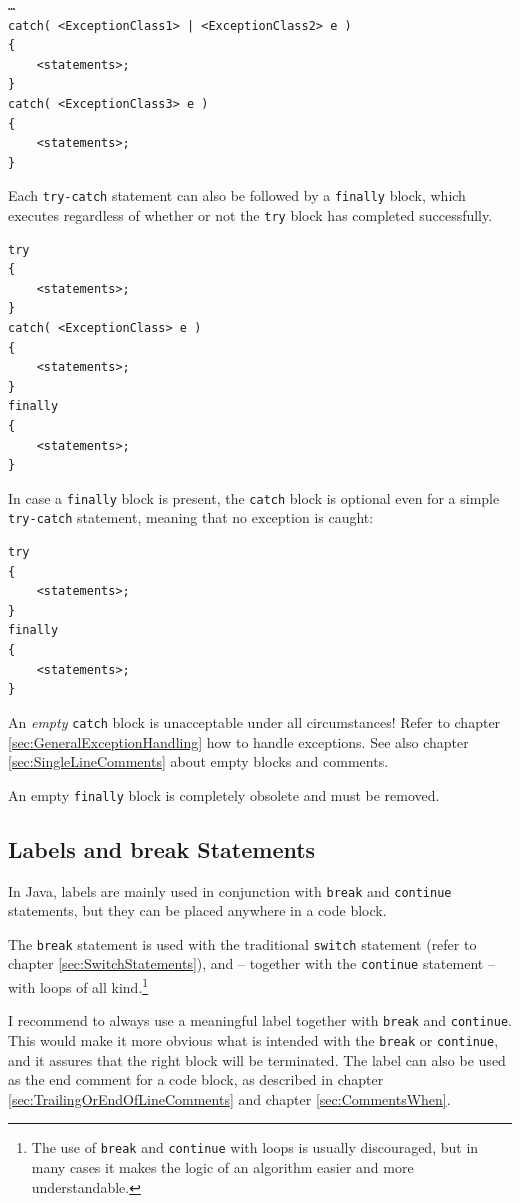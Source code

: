 \documentclass[12pt,a4paper,titlepage, parskip=half, headsepline, footsepline, cleardoubleplain]{scrbook}
\begin{document}
\begin{lstlisting}
…
catch( <ExceptionClass1> | <ExceptionClass2> e )
{
    <statements>;
}
catch( <ExceptionClass3> e )
{
    <statements>;
}
\end{lstlisting}

Each \lstinline|try-catch| statement can also be followed by a \lstinline|finally| block, which  executes regardless of whether or not the \lstinline|try| block has completed successfully.

\begin{lstlisting}
try
{
    <statements>;
}
catch( <ExceptionClass> e )
{
    <statements>;
}
finally
{
    <statements>;
}
\end{lstlisting}

In case a \lstinline|finally| block is present, the \lstinline|catch| block is optional even for a simple \lstinline|try-catch| statement, meaning that no exception is caught:
\begin{lstlisting}
try
{
    <statements>;
}
finally
{
    <statements>;
}
\end{lstlisting}

An \textit{empty} \lstinline|catch| block is unacceptable under all circumstances! Refer to chapter \vref{sec:GeneralExceptionHandling} how to handle exceptions. See also chapter \vref{sec:SingleLineComments} about empty blocks and comments.

An empty \lstinline|finally| block is completely obsolete and must be removed.

\subsection{Labels and break Statements}\label{sec:LabelsAndBreakStatements}
In Java, labels are mainly used in conjunction with \lstinline|break| and \lstinline|continue| statements, but they can be placed anywhere in a code block.

The \lstinline|break| statement is used with the traditional \lstinline|switch| statement (refer to chapter \ref{sec:SwitchStatements}), and – together with the \lstinline|continue| statement – with loops of all kind.\footnote{The use of \lstinline|break| and \lstinline|continue| with loops is usually discouraged, but in many cases it makes the logic of an algorithm easier and more understandable.}

I recommend to always use a meaningful label together with \lstinline|break| and \lstinline|continue|. This would make it more obvious what is intended with the \lstinline|break| or \lstinline|continue|, and it assures that the right block will be terminated. The label can also be used as the end comment for a code block, as described in chapter \ref{sec:TrailingOrEndOfLineComments} and chapter \ref{sec:CommentsWhen}.
\end{document}
